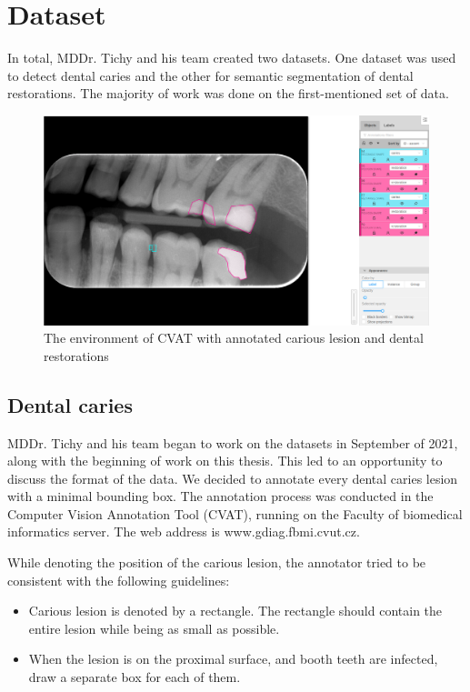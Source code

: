 \chapter{Dataset}
\label{chapter:dataset}
In total,  MDDr. Tichy and his team created two datasets. One dataset was used to detect dental caries and the other for semantic segmentation of dental restorations. The majority of work was done on the first-mentioned set of data.

\begin{figure}
    \centering
    \includegraphics[width=\linewidth]{images/cvat.png}
    \caption{The environment of CVAT with annotated carious lesion and dental restorations}
    \label{fig:cvat}
\end{figure}

\section{Dental caries}
MDDr. Tichy and his team began to work on the datasets in September of 2021, along with the beginning of work on this thesis. This led to an opportunity to discuss the format of the data. We decided to annotate every dental caries lesion with a minimal bounding box. The annotation process was conducted in the Computer Vision Annotation Tool (CVAT), running on the Faculty of biomedical informatics server. The web address is www.gdiag.fbmi.cvut.cz.

While denoting the position of the carious lesion, the annotator tried to be consistent with the following guidelines:

\begin{itemize}
    \item Carious lesion is denoted by a rectangle. The rectangle should contain the entire lesion while being as small as possible.
    \item When the lesion is on the proximal surface, and booth teeth are infected, draw a separate box for each of them.
\end{itemize}

